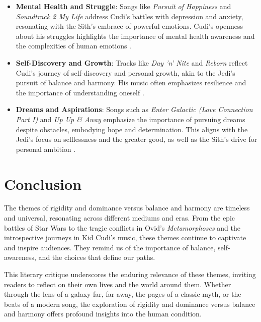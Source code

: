 \documentclass{article}
\begin{document}
\begin{itemize}
    \item \textbf{Mental Health and Struggle}: Songs like \textit{Pursuit of Happiness} and \textit{Soundtrack 2 My Life} address Cudi's battles with depression and anxiety, resonating with the Sith's embrace of powerful emotions. Cudi's openness about his struggles highlights the importance of mental health awareness and the complexities of human emotions \cite{aditi2025insights,holr2025close}.
    \item \textbf{Self-Discovery and Growth}: Tracks like \textit{Day 'n' Nite} and \textit{Reborn} reflect Cudi's journey of self-discovery and personal growth, akin to the Jedi's pursuit of balance and harmony. His music often emphasizes resilience and the importance of understanding oneself \cite{aditi2025insights,holr2025close}.
    \item \textbf{Dreams and Aspirations}: Songs such as \textit{Enter Galactic (Love Connection Part I)} and \textit{Up Up \& Away} emphasize the importance of pursuing dreams despite obstacles, embodying hope and determination. This aligns with the Jedi's focus on selflessness and the greater good, as well as the Sith's drive for personal ambition \cite{aditi2025insights,holr2025close}.
\end{itemize}

\section*{Conclusion}

The themes of rigidity and dominance versus balance and harmony are timeless and universal, resonating across different mediums and eras. From the epic battles of Star Wars to the tragic conflicts in Ovid's \textit{Metamorphoses} and the introspective journeys in Kid Cudi's music, these themes continue to captivate and inspire audiences. They remind us of the importance of balance, self-awareness, and the choices that define our paths.

This literary critique underscores the enduring relevance of these themes, inviting readers to reflect on their own lives and the world around them. Whether through the lens of a galaxy far, far away, the pages of a classic myth, or the beats of a modern song, the exploration of rigidity and dominance versus balance and harmony offers profound insights into the human condition.



\end{document}
